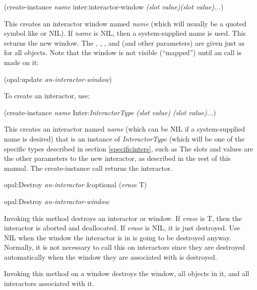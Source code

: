 \begin{programexample}
(create-instance {\it name} inter:interactor-window {\it (slot value)(slot value)...})
\end{programexample}
This creates an interactor window named {\it name} (which will usually be a
quoted symbol like  or NIL).  If {\it name} is NIL, then a
system-supplied name is used.  This returns the new
window.  The , , , and  (and other
parameters) are given just as for all objects.
Note that the window is not visible (``mapped'')
until an  call is made on it:
\begin{programexample}
(opal:update {\it an-interactor-window})
\end{programexample}

To create an interactor, use:
\begin{programexample}
(create-instance {\it name} Inter:{\it InteractorType} {\it (slot value) (slot value)...})
\end{programexample}
This creates an interactor named {\it name} (which can be NIL if
a system-supplied name is desired) that is an instance of {\it InteractorType}
(which will be one of the specific types described in section
\ref{specificinters}, such as   The slots and values are the other parameters to the new
interactor, as described in the rest of this manual.  The create-instance
call returns the interactor.

\vspace{1 line}

\begin{programexample}
opal:Destroy {\it an-interactor} \&optional ({\it erase} T) \value{method}

opal:Destroy {\it an-interactor-window} \value{method}
\end{programexample}
\vspace{1 line}

Invoking this method destroys an interactor or window.  If {\it erase} is T,
then the interactor is aborted and
deallocated.  If {\it erase} is NIL, it is just destroyed.  Use NIL
when the window the interactor is in is going to be destroyed anyway.
Normally, it is not necessary to call this on interactors since they are
destroyed automatically when the window they are associated with is destroyed.

Invoking this method on a window destroys the window, all objects in it,
and all interactors associated with it.



